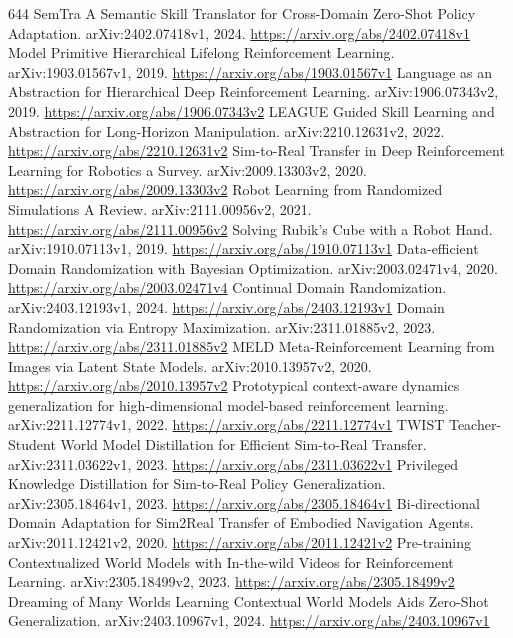 \documentclass[11pt]{article}
\begin{document}
\begin{thebibliography}{644}
 SemTra A Semantic Skill Translator for Cross-Domain Zero-Shot Policy Adaptation. arXiv:2402.07418v1, 2024. \url{https://arxiv.org/abs/2402.07418v1}
 Model Primitive Hierarchical Lifelong Reinforcement Learning. arXiv:1903.01567v1, 2019. \url{https://arxiv.org/abs/1903.01567v1}
 Language as an Abstraction for Hierarchical Deep Reinforcement Learning. arXiv:1906.07343v2, 2019. \url{https://arxiv.org/abs/1906.07343v2}
 LEAGUE Guided Skill Learning and Abstraction for Long-Horizon Manipulation. arXiv:2210.12631v2, 2022. \url{https://arxiv.org/abs/2210.12631v2}
 Sim-to-Real Transfer in Deep Reinforcement Learning for Robotics a Survey. arXiv:2009.13303v2, 2020. \url{https://arxiv.org/abs/2009.13303v2}
 Robot Learning from Randomized Simulations A Review. arXiv:2111.00956v2, 2021. \url{https://arxiv.org/abs/2111.00956v2}
 Solving Rubik's Cube with a Robot Hand. arXiv:1910.07113v1, 2019. \url{https://arxiv.org/abs/1910.07113v1}
 Data-efficient Domain Randomization with Bayesian Optimization. arXiv:2003.02471v4, 2020. \url{https://arxiv.org/abs/2003.02471v4}
 Continual Domain Randomization. arXiv:2403.12193v1, 2024. \url{https://arxiv.org/abs/2403.12193v1}
 Domain Randomization via Entropy Maximization. arXiv:2311.01885v2, 2023. \url{https://arxiv.org/abs/2311.01885v2}
 MELD Meta-Reinforcement Learning from Images via Latent State Models. arXiv:2010.13957v2, 2020. \url{https://arxiv.org/abs/2010.13957v2}
 Prototypical context-aware dynamics generalization for high-dimensional model-based reinforcement learning. arXiv:2211.12774v1, 2022. \url{https://arxiv.org/abs/2211.12774v1}
 TWIST Teacher-Student World Model Distillation for Efficient Sim-to-Real Transfer. arXiv:2311.03622v1, 2023. \url{https://arxiv.org/abs/2311.03622v1}
 Privileged Knowledge Distillation for Sim-to-Real Policy Generalization. arXiv:2305.18464v1, 2023. \url{https://arxiv.org/abs/2305.18464v1}
 Bi-directional Domain Adaptation for Sim2Real Transfer of Embodied Navigation Agents. arXiv:2011.12421v2, 2020. \url{https://arxiv.org/abs/2011.12421v2}
 Pre-training Contextualized World Models with In-the-wild Videos for Reinforcement Learning. arXiv:2305.18499v2, 2023. \url{https://arxiv.org/abs/2305.18499v2}
 Dreaming of Many Worlds Learning Contextual World Models Aids Zero-Shot Generalization. arXiv:2403.10967v1, 2024. \url{https://arxiv.org/abs/2403.10967v1}

\end{thebibliography}
\end{document}
